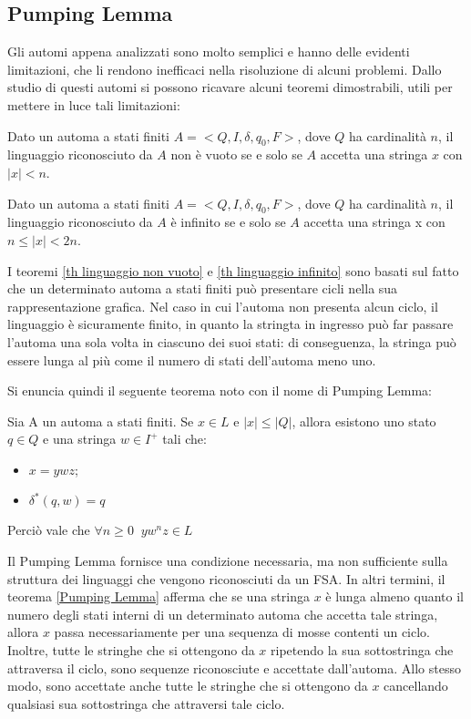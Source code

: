   \subsection{Pumping Lemma}
  Gli automi appena analizzati sono molto semplici e hanno delle evidenti limitazioni, che li rendono inefficaci nella risoluzione di alcuni problemi. 
  Dallo studio di questi automi si possono ricavare alcuni teoremi dimostrabili, utili per mettere in luce tali limitazioni:

  \begin{theorem} \label{th linguaggio non vuoto}
    Dato un automa a stati finiti \(A=<Q, I, \delta, q_0, F>\), dove \(Q\) ha cardinalità \(n\), il linguaggio riconosciuto da \(A\) non è vuoto se e solo se \(A\) accetta una stringa \(x\) con \(|x|<n\).
  \end{theorem}

  \begin{theorem} \label{th linguaggio infinito}
    Dato un automa a stati finiti \(A=<Q, I, \delta, q_0, F>\), dove \(Q\) ha cardinalità \(n\), il linguaggio riconosciuto da \(A\) è infinito se e solo se \(A\) accetta una stringa x con \(n\le |x| < 2n\).
  \end{theorem}

  I teoremi \ref{th linguaggio non vuoto} e \ref{th linguaggio infinito} sono basati sul fatto che un determinato automa a stati finiti può presentare cicli nella sua rappresentazione grafica. Nel caso in cui l'automa non presenta alcun ciclo, il linguaggio è sicuramente finito, in quanto la stringta in ingresso può far passare l'automa una sola volta in ciascuno dei suoi stati: di conseguenza, la stringa può essere lunga al più come il numero di stati dell'automa meno uno. 

  Si enuncia quindi il seguente teorema noto con il nome di Pumping Lemma:

  \begin{theorem} \label{Pumping Lemma}
    Sia A un automa a stati finiti. Se \(x \in L\)  e \(|x|\leq|Q|\), allora esistono uno stato \(q \in Q\) e una stringa \(w \in I^+\) tali che:
    \begin{itemize}
      \item \(x = ywz\);
      \item \(\delta^*(q,w)=q\)
    \end{itemize}
    Perciò vale che \(\forall n\geq 0 \;\; yw^nz\in L\)
  \end{theorem}

  Il Pumping Lemma fornisce una condizione necessaria, ma non sufficiente sulla struttura dei linguaggi che vengono riconosciuti da un FSA. In altri termini, il teorema \ref{Pumping Lemma} afferma che se una stringa \(x\) è lunga almeno quanto il numero degli stati interni di un determinato automa che accetta tale stringa, allora \(x\) passa necessariamente per una sequenza di mosse contenti un ciclo. Inoltre, tutte le stringhe che si ottengono da \(x\) ripetendo la sua sottostringa che attraversa il ciclo, sono sequenze riconosciute e accettate dall’automa. Allo stesso modo, sono accettate anche tutte le stringhe che si ottengono da \(x\) cancellando qualsiasi sua sottostringa che attraversi tale ciclo.

